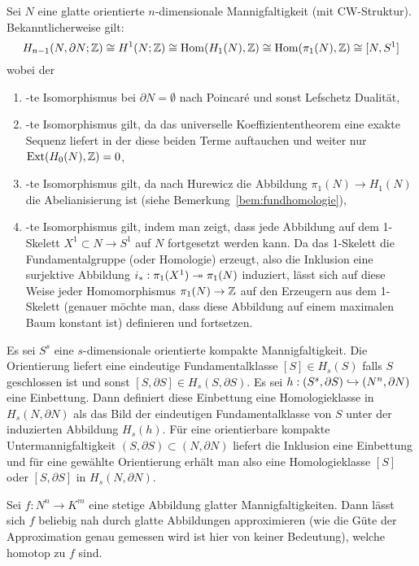 	\begin{bem}
	\label{bem:identifications}
	Sei $N$ eine glatte orientierte $n$-dimensionale Mannigfaltigkeit (mit CW-Struktur).
		Bekanntlicherweise gilt:
		\[
					H_{n-1}(N,\partial N;\mathbb{Z})\cong H^1(N;\mathbb{Z}) \cong \operatorname{Hom}(H_1(N),\mathbb{Z}) \cong \operatorname{Hom}(\pi_1(N),\mathbb{Z}) \cong  [N,S^1]
		\]		
		wobei der
		\begin{enumerate}
			\item -te Isomorphismus bei $\partial N= \emptyset$ nach Poincaré und sonst Lefschetz Dualität,
			\item -te Isomorphismus gilt, da das universelle Koeffiziententheorem eine exakte Sequenz liefert in der diese beiden Terme auftauchen und weiter nur $\operatorname{Ext}(H_0(N),\mathbb{Z}) = 0$,
			\item -te Isomorphismus gilt, da nach Hurewicz die Abbildung $\pi_1(N)\to H_1(N)$ die Abelianisierung ist (siehe Bemerkung~\ref{bem:fundhomologie}),
			\item -te Isomorphismus gilt, indem man zeigt, dass jede Abbildung auf dem 1-Skelett $X^1 \subset N \to S^1$ auf $N$ fortgesetzt werden kann. Da das 1-Skelett die Fundamentalgruppe (oder Homologie) erzeugt, also die Inklusion eine surjektive Abbildung $i_*:\pi_1(X^1)\twoheadrightarrow\pi_1(N)$ induziert, lässt sich auf diese Weise jeder Homomorphismus $\pi_1(N)\to \mathbb{Z}$ auf den Erzeugern aus dem 1-Skelett (genauer möchte man, dass diese Abbildung auf einem maximalen Baum konstant ist) definieren und fortsetzen. 
		\end{enumerate}


	\end{bem}
	\begin{bem}
	\label{bem:untermannigfaltigkeitenalshomologie}
		Es sei $S^s$ eine $s$-dimensionale orientierte kompakte Mannigfaltigkeit. Die Orientierung liefert eine eindeutige Fundamentalklasse $[S] \in H_s(S)$ falls $S$ geschlossen ist und sonst $[S,\partial S] \in H_s(S,\partial S)$. Es sei $h:(S^s,\partial S) \hookrightarrow (N^n,\partial N)$ eine Einbettung. Dann definiert diese Einbettung eine Homologieklasse in $H_s(N,\partial N)$ als das Bild der eindeutigen Fundamentalklasse von $S$ unter der induzierten Abbildung $H_s(h)$. Für eine orientierbare kompakte Untermannigfaltigkeit $(S,\partial S) \subset (N,\partial N)$ liefert die Inklusion eine Einbettung und für eine gewählte Orientierung erhält man also eine Homologieklasse $[S]$ oder $[S,\partial S]$ in $H_s(N,\partial N)$.
	\end{bem}
	\begin{thm}
		Sei $f:N^n\to K^m$ eine stetige Abbildung glatter Mannigfaltigkeiten. Dann lässt sich $f$ beliebig nah durch glatte Abbildungen approximieren (wie die Güte der Approximation genau gemessen wird ist hier von keiner Bedeutung), welche homotop zu $f$ sind.
	\end{thm}
